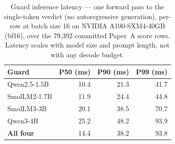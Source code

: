 \begin{table}[H]\centering\small
\caption{Guard inference latency --- one forward pass to the single-token verdict (no autoregressive generation), per-row at batch size 16 on NVIDIA A100-SXM4-40GB (bf16), over the 79,392 committed Paper~A score rows. Latency scales with model size and prompt length, not with any decode budget.}
\label{tab:latency}
\begin{tabular}{lrrr}\toprule
Guard & P50 (ms) & P90 (ms) & P99 (ms) \\
\midrule
Qwen2.5-1.5B & 10.4 & 21.3 & 41.7 \\
SmolLM2-1.7B & 11.9 & 24.4 & 44.8 \\
SmolLM3-3B & 20.1 & 38.5 & 70.7 \\
Qwen3-4B & 25.2 & 48.2 & 93.9 \\
\midrule
\textbf{All four} & 14.4 & 38.2 & 93.8 \\
\bottomrule
\end{tabular}
\end{table}

